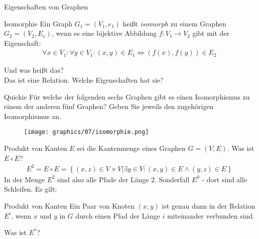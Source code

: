 \begin{frame}{Eigenschaften von Graphen}
    \begin{block}{Isomorphie}
        Ein Graph $G_1 = \left( V_1, e_1 \right) $ heißt \emph{isomorph} zu einem Graphen $G_2 = \left( V_2,E_s \right)$, wenn es eine bijektive Abbildung $f: V_1 \rightarrow V_2$ gibt mit der Eigenschaft:
        \begin{align*}
            \forall x\in V_1: \forall y \in V_1: \left( x, y \right) \in E_1 \Longleftrightarrow \left( f\left( x \right),f\left( y \right) \right)\in E_2
        \end{align*}
    \end{block}
    Und was heißt das? \\
    \pause
    Das ist eine Relation. Welche Eigenschaften hat sie?
\end{frame}

\begin{frame}{Quickie}
    Für welche der folgenden sechs Graphen gibt es einen Isomorphismus zu einem der anderen fünf Graphen? Geben Sie jeweils den zugehörigen Isomorphismus an.
    \begin{figure}[h]
        \centering
        \texttt{[image: graphics/07/isomorphie.png]}
    \end{figure}
\end{frame}

\begin{frame}{Produkt von Kanten}
    $E$ sei die Kantenmenge eines Graphen $G = \left( V,E \right)$. Was ist $E \circ E$?
    \pause
    \begin{align*}
        E^2 = E\circ E = \left\{ \left( x,z \right)\in V\times V\big| \exists y \in V: \left( x,y \right)\in E \wedge \left( y,z \right) \in E \right\}
    \end{align*}
    In der Menge $E^2$ sind also alle Pfade der Länge $2$. Sonderfall $E^0$ - dort sind alle Schleifen. Es gilt:
    \begin{block}{Produkt von Kanten}
        Ein Paar von Knoten $\left( x,y \right)$ ist genau dann in der Relation $E^i$, wenn $x$ und $y$ in $G$ durch einen Pfad der Länge $i$ miteinander verbunden sind.
    \end{block}
    \pause
    Was ist $E^*$?
\end{frame}

